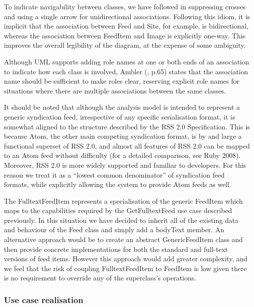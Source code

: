 \documentclass[runningheads,a4paper]{llncs}
\begin{document}
To indicate navigability between classes, we have followed \cite{arlow} in suppressing crosses and using a single arrow for unidirectional associations. Following this idiom, it is implicit that the association between \textsf{Feed} and \textsf{Site}, for example, is bidirectional, whereas the association between \textsf{FeedItem} and \textsf{Image} is explicitly one-way. This improves the overall legibility of the diagram, at the expense of some ambiguity.

Although UML supports adding role names at one or both ends of an association to indicate how each class is involved, Ambler (\cite{arlow}, p.65) states that the association name should be sufficient to make roles clear, reserving explicit role names for situations where there are multiple associations between the same classes.

It should be noted that although the analysis model is intended to represent a generic syndication feed, irrespective of any specific serialisation format, it is somewhat aligned to the structure described by the RSS 2.0 Specification\cite{rss}. This is because Atom, the other main competing syndication format, is by and large a functional superset of RSS 2.0, and almost all features of RSS 2.0 can be mapped to an Atom feed without difficulty (for a detailed comparison, see Ruby 2008). Moreover, RSS 2.0 is more widely supported and familiar to developers. For this reason we treat it as a ``lowest common denominator'' of syndication feed formats, while explicitly allowing the system to provide Atom feeds as well.

The \textsf{FulltextFeedItem} represents a specialisation of the generic \textsf{FeedItem} which maps to the capabilities required by the \textsf{GetFulltextFeed} use case described previously. In this situation we have decided to inherit all of the existing data and behaviour of the \textsf{Feed} class and simply add a \textsf{bodyText} member. An alternative approach would be to create an abstract \textsf{GenericFeedItem} class and then provide concrete implementations for both the standard and full-text versions of feed items. However this approach would add greater complexity, and we feel that the risk of coupling \textsf{FulltextFeedItem} to \textsf{FeedItem} is low given there is no requirement to override any of the superclass's operations.

\subsubsection{Use case realisation}
\end{document}
